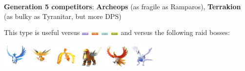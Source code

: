 \documentclass[8pt,aspectratio=169,compress]{beamer}
\newcommand{\bugfull}{\includegraphics[height=0.15cm]{../../images/type/full/Bug.png}}
\newcommand{\firefull}{\includegraphics[height=0.15cm]{../../images/type/full/Fire.png}}
\newcommand{\flyingfull}{\includegraphics[height=0.15cm]{../../images/type/full/Flying.png}}
\newcommand{\icefull}{\includegraphics[height=0.15cm]{../../images/type/full/Ice.png}}
\begin{document}
\begin{frame}
\begin{tiny}
\begin{block}{}
\begin{center}
\textbf{Generation 5 competitors}: \textbf{Archeops} (as fragile as Ramparos), \textbf{Terrakion} (as bulky as Tyranitar, but more DPS)
\end{center}
\end{block}

\begin{block}{}\begin{center}
This type is useful versus \flyingfull~\firefull~\icefull~\bugfull~and versus the following raid bosses:

    \includegraphics[width=1.25cm]{../../images/pokemon/articuno.png}
    \includegraphics[width=1.25cm]{../../images/pokemon/zapdos.png}
    \includegraphics[width=1.25cm]{../../images/pokemon/moltres.png}
    \includegraphics[width=1.25cm]{../../images/pokemon/entei.png}
    \includegraphics[width=1.25cm]{../../images/pokemon/ho-oh.png}
    \includegraphics[width=1.25cm]{../../images/pokemon/lugia.png}
    \end{center}
\end{block}

\end{tiny}
\end{frame}


\end{document}
